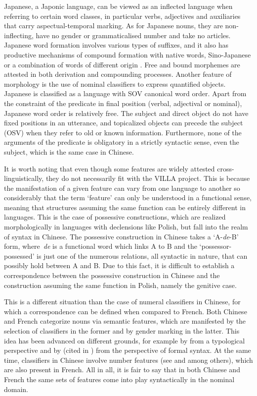\documentclass[output=paper,colorlinks,citecolor=brown,modfonts,nonflat]{../langscibook}
\begin{document}
Japanese, a Japonic language, can be viewed as an inflected language when referring to certain word classes, in particular verbs, adjectives and auxiliaries that carry aspectual-temporal marking. As for Japanese nouns, they are non-inflecting, have no gender or grammaticalised number and take no articles. Japanese word formation involves various types of suffixes, and it also has productive mechanisms of compound formation with native words, Sino-Japanese or a combination of words of different origin \citep{Shibatani1990}. Free and bound morphemes are attested in both derivation and compounding processes. Another feature of morphology is the use of nominal classifiers to express quantified objects. Japanese is classified as a language with SOV canonical word order. Apart from the constraint of the predicate in final position (verbal, adjectival or nominal), Japanese word order is relatively free. The subject and direct object do not have fixed positions in an utterance, and topicalized objects can precede the subject (OSV) when they refer to old or known information. Furthermore, none of the arguments of the predicate is obligatory in a strictly syntactic sense, even the subject, which is the same case in Chinese.


It is worth noting that even though some features are widely attested cross-linguistically, they do not necessarily fit with the VILLA project. This is because the manifestation of a given feature can vary from one language to another so considerably that the term ‘feature’ can only be understood in a functional sense, meaning that structures assuming the same function can be entirely different in languages. This is the case of possessive constructions, which are realized morphologically in languages with declensions like Polish, but fall into the realm of syntax in Chinese. The possessive construction in Chinese takes a ‘A-\textit{de}{}-B’ form, where~\textit{de} is a functional word which links A to B and the ‘possessor-possessed’ is just one of the numerous relations, all syntactic in nature, that can possibly hold between A and B. Due to this fact, it is difficult to establish a correspondence between the possessive construction in Chinese and the construction assuming the same function in Polish, namely the genitive case.



{This is a different situation than the case of numeral classifiers in Chinese, for which a correspondence can be defined when compared to French. Both Chinese and French categorize nouns via semantic features, which are manifested by the selection of classifiers in the former and by gender marking in the latter. This idea has been advanced on different grounds, for example by \citet{Aikhenvald2000} from a typological perspective and by \citet{Picallo2008} (cited in \citealt{Rouveret2016}) from the perspective of formal syntax. At the same time, classifiers in Chinese involve number features (see \citealt{ChengSybesma1998} and \citealt{Li1999} among others), which are also present in French. All in all, it is fair to say that in both Chinese and French the same sets of features come into play syntactically in the nominal domain.~}
\end{document}
